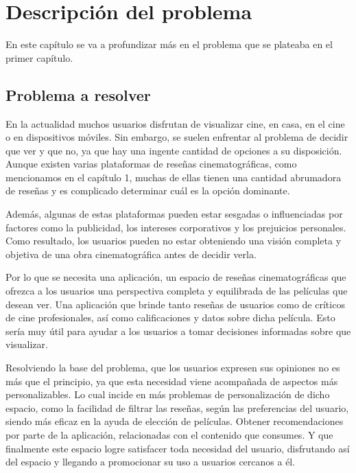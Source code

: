 \chapter{Descripción del problema}

En este capítulo se va a profundizar más en el problema que se plateaba en el primer capítulo.

\section{Problema a resolver}

En la actualidad muchos usuarios disfrutan de visualizar cine, en casa, en el cine o en 
dispositivos móviles. Sin embargo, se suelen enfrentar al problema de decidir que ver y que no, ya que 
hay una ingente cantidad de opciones a su disposición. Aunque existen varias plataformas de reseñas 
cinematográficas, como mencionamos en el capítulo 1, muchas de ellas tienen una cantidad abrumadora de 
reseñas y es complicado determinar cuál es la opción dominante.

Además, algunas de estas plataformas pueden estar sesgadas o influenciadas por factores como la 
publicidad, los intereses corporativos y los prejuicios personales. Como resultado, los usuarios pueden 
no estar obteniendo una visión completa y objetiva de una obra cinematográfica antes de 
decidir verla.

Por lo que se necesita una aplicación, un espacio de reseñas cinematográficas que ofrezca a los 
usuarios una perspectiva completa y equilibrada de las películas que desean ver. Una 
aplicación que brinde tanto reseñas de usuarios como de críticos de cine profesionales, así como 
calificaciones y datos sobre dicha película. Esto sería muy útil para ayudar a los usuarios a 
tomar decisiones informadas sobre que visualizar.

Resolviendo la base del problema, que los usuarios expresen sus opiniones no es más que el principio, 
ya que esta necesidad viene acompañada de aspectos más personalizables. Lo cual incide en más problemas 
de personalización de dicho espacio, como la facilidad de filtrar las reseñas, según las preferencias 
del usuario, siendo más eficaz en la ayuda de elección de películas. Obtener recomendaciones 
por parte de la aplicación, relacionadas con el contenido que consumes. Y que finalmente este espacio 
logre satisfacer toda necesidad del usuario, disfrutando así del espacio y llegando a promocionar su 
uso a usuarios cercanos a él.

